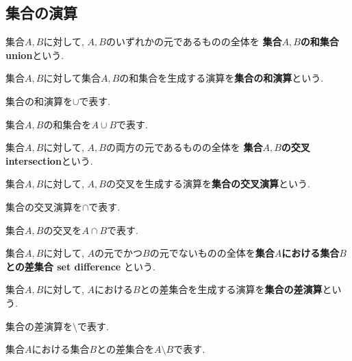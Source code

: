 \subsection{集合の演算}
\begin{Def}
集合$A,B$に対して,
$A,B$のいずれかの元であるものの全体を
{\bf 集合$A,B$の和集合 union}という.
\end{Def}
\begin{Def}
集合$A,B$に対して集合$A,B$の和集合を生成する演算を{\bf 集合の和演算}という.
\end{Def}
\begin{Notation}
集合の和演算を$\cup$で表す.
\end{Notation}
\begin{Notation}
集合$A,B$の和集合を$A\cup B$で表す.
\end{Notation}
\begin{Def}
集合$A,B$に対して, $A,B$の両方の元であるものの全体を
{\bf 集合$A,B$の交叉 intersection}という.
\end{Def}
\begin{Def}
集合$A,B$に対して, $A,B$の交叉を生成する演算を{\bf 集合の交叉演算}という.
\end{Def}
\begin{Def}
集合の交叉演算を$\cap$で表す.
\end{Def}
\begin{Notation}
集合$A,B$の交叉を$A\cap B$で表す.
\end{Notation}
\begin{Def}
集合$A,B$に対して,
$A$の元でかつ$B$の元でないものの全体を{\bf 集合$A$における集合$B$との差集合 set difference}
という.
\end{Def}
\begin{Def}
集合$A,B$に対して, $A$における$B$との差集合を生成する演算を{\bf 集合の差演算}という.
\end{Def}
\begin{Notation}
集合の差演算を$\setminus$で表す.
\end{Notation}
\begin{Notation}
集合$A$における集合$B$との差集合を$A\setminus B$で表す.
\end{Notation}

